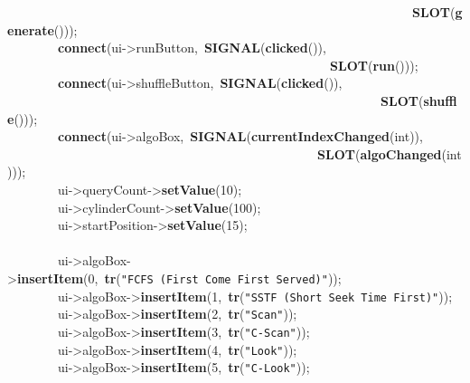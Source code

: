 \mbox{}\ \ \ \ \ \ \ \ \ \ \ \ \ \ \ \ \ \ \ \ \ \ \ \ \ \ \ \ \ \ \ \ \ \ \ \ \ \ \ \ \ \ \ \ \ \ \ \ \ \ \ \ \ \ \ \ \ \ \ \ \ \ \ \ \textbf{SLOT}(\textbf{generate}())); \\
\mbox{}\ \ \ \ \ \ \ \ \textbf{connect}(ui-\textgreater{}runButton,\ \textbf{SIGNAL}(\textbf{clicked}()), \\
\mbox{}\ \ \ \ \ \ \ \ \ \ \ \ \ \ \ \ \ \ \ \ \ \ \ \ \ \ \ \ \ \ \ \ \ \ \ \ \ \ \ \ \ \ \ \ \ \ \ \ \ \ \ \textbf{SLOT}(\textbf{run}())); \\
\mbox{}\ \ \ \ \ \ \ \ \textbf{connect}(ui-\textgreater{}shuffleButton,\ \textbf{SIGNAL}(\textbf{clicked}()), \\
\mbox{}\ \ \ \ \ \ \ \ \ \ \ \ \ \ \ \ \ \ \ \ \ \ \ \ \ \ \ \ \ \ \ \ \ \ \ \ \ \ \ \ \ \ \ \ \ \ \ \ \ \ \ \ \ \ \ \ \ \ \ \textbf{SLOT}(\textbf{shuffle}())); \\
\mbox{}\ \ \ \ \ \ \ \ \textbf{connect}(ui-\textgreater{}algoBox,\ \textbf{SIGNAL}(\textbf{currentIndexChanged}(int)), \\
\mbox{}\ \ \ \ \ \ \ \ \ \ \ \ \ \ \ \ \ \ \ \ \ \ \ \ \ \ \ \ \ \ \ \ \ \ \ \ \ \ \ \ \ \ \ \ \ \ \ \ \ \textbf{SLOT}(\textbf{algoChanged}(int))); \\
\mbox{}\ \ \ \ \ \ \ \ ui-\textgreater{}queryCount-\textgreater{}\textbf{setValue}(10); \\
\mbox{}\ \ \ \ \ \ \ \ ui-\textgreater{}cylinderCount-\textgreater{}\textbf{setValue}(100); \\
\mbox{}\ \ \ \ \ \ \ \ ui-\textgreater{}startPosition-\textgreater{}\textbf{setValue}(15); \\
\mbox{} \\
\mbox{}\ \ \ \ \ \ \ \ ui-\textgreater{}algoBox-\textgreater{}\textbf{insertItem}(0,\ \textbf{tr}(\texttt{"{}FCFS\ (First\ Come\ First\ Served)"{}})); \\
\mbox{}\ \ \ \ \ \ \ \ ui-\textgreater{}algoBox-\textgreater{}\textbf{insertItem}(1,\ \textbf{tr}(\texttt{"{}SSTF\ (Short\ Seek\ Time\ First)"{}})); \\
\mbox{}\ \ \ \ \ \ \ \ ui-\textgreater{}algoBox-\textgreater{}\textbf{insertItem}(2,\ \textbf{tr}(\texttt{"{}Scan"{}})); \\
\mbox{}\ \ \ \ \ \ \ \ ui-\textgreater{}algoBox-\textgreater{}\textbf{insertItem}(3,\ \textbf{tr}(\texttt{"{}C-Scan"{}})); \\
\mbox{}\ \ \ \ \ \ \ \ ui-\textgreater{}algoBox-\textgreater{}\textbf{insertItem}(4,\ \textbf{tr}(\texttt{"{}Look"{}})); \\
\mbox{}\ \ \ \ \ \ \ \ ui-\textgreater{}algoBox-\textgreater{}\textbf{insertItem}(5,\ \textbf{tr}(\texttt{"{}C-Look"{}})); \\
